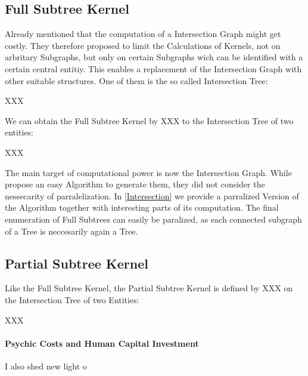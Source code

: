\subsection{Full Subtree Kernel}
Already \citet{mainsource} mentioned that the computation of a Intersection Graph might get costly. They therefore proposed to limit the Calculations of Kernels, not on arbritary Subgraphs, but only on certain Subgraphs wich can be identified with a certain central entitiy. This enables a replacement of the Intersection Graph with other suitable structures. One of them is the so called Intersection Tree:

\begin{Definition}
XXX
\end{Definition}

We can obtain the Full Subtree Kernel by XXX to the Intersection Tree of two entities:

\begin{Definition}
XXX
\end{Definition}

The main target of computational power is now the Intersection Graph. While \citet{mainreference} propose an easy Algorithm to generate them, they did not consider the nessecarity of parralelization. In \ref{Intersection} we provide a parralized Version of the Algorithm together with interesting parts of its computation. The final enumeration of Full Subtrees can easily be paralized, as each connected subgraph of a Tree is neccesarily again a Tree. 

\subsection{Partial Subtree Kernel}

Like the Full Subtree Kernel, the Partial Subtree Kernel is defined by XXX on the Intersection Tree of two Entities:

\begin{Definition}
XXX
\end{Definition}


%

%



\paragraph{Psychic Costs and Human Capital Investment} I also shed new light o
